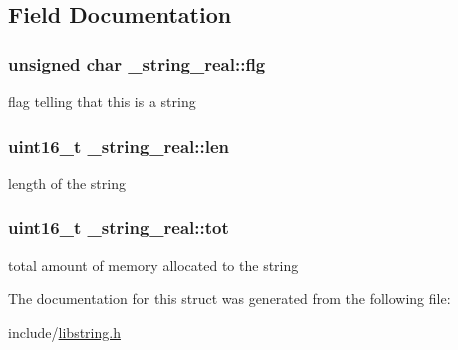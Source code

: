 \subsection{Field Documentation}
\hypertarget{struct__string__real_ac23d3f9fe5d59437dece0bc99488ef85}{
\subsubsection[{flg}]{\setlength{\rightskip}{0pt plus 5cm}unsigned char \-\_\-string\-\_\-real\-::flg}}\label{struct__string__real_ac23d3f9fe5d59437dece0bc99488ef85}
flag telling that this is a string \hypertarget{struct__string__real_a4c51041b496d561d8ea8c8af4aa34ea5}{
\subsubsection[{len}]{\setlength{\rightskip}{0pt plus 5cm}uint16\-\_\-t \-\_\-string\-\_\-real\-::len}}\label{struct__string__real_a4c51041b496d561d8ea8c8af4aa34ea5}
length of the string \hypertarget{struct__string__real_a0a2aeea98f557b0e98e15aa42414e855}{
\subsubsection[{tot}]{\setlength{\rightskip}{0pt plus 5cm}uint16\-\_\-t \-\_\-string\-\_\-real\-::tot}}\label{struct__string__real_a0a2aeea98f557b0e98e15aa42414e855}
total amount of memory allocated to the string 

The documentation for this struct was generated from the following file\-:\begin{DoxyCompactItemize}
\item 
include/\hyperlink{libstring_8h}{libstring.\-h}\end{DoxyCompactItemize}
